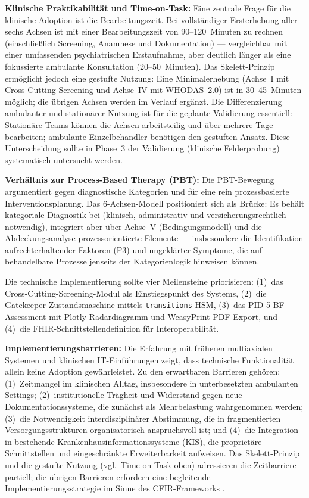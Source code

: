 \documentclass[11pt,a4paper]{article}
\begin{document}
\textbf{Klinische Praktikabilit\"at und Time-on-Task:} Eine zentrale Frage f\"ur die klinische Adoption ist die Bearbeitungszeit. Bei vollst\"andiger Ersterhebung aller sechs Achsen ist mit einer Bearbeitungszeit von 90--120~Minuten zu rechnen (einschlie\ss{}lich Screening, Anamnese und Dokumentation) --- vergleichbar mit einer umfassenden psychiatrischen Erstaufnahme, aber deutlich l\"anger als eine fokussierte ambulante Konsultation (20--50~Minuten). Das Skelett-Prinzip erm\"oglicht jedoch eine gestufte Nutzung: Eine Minimalerhebung (Achse~I mit Cross-Cutting-Screening und Achse~IV mit WHODAS~2.0) ist in 30--45~Minuten m\"oglich; die \"ubrigen Achsen werden im Verlauf erg\"anzt. Die Differenzierung ambulanter und station\"arer Nutzung ist f\"ur die geplante Validierung essentiell: Station\"are Teams k\"onnen die Achsen arbeitsteilig und \"uber mehrere Tage bearbeiten; ambulante Einzelbehandler ben\"otigen den gestuften Ansatz. Diese Unterscheidung sollte in Phase~3 der Validierung (klinische Felderprobung) systematisch untersucht werden.

\textbf{Verh\"altnis zur Process-Based Therapy (PBT):} Die PBT-Bewegung argumentiert gegen diagnostische Kategorien und f\"ur eine rein prozessbasierte Interventionsplanung. Das 6-Achsen-Modell positioniert sich als Br\"ucke: Es beh\"alt kategoriale Diagnostik bei (klinisch, administrativ und versicherungsrechtlich notwendig), integriert aber \"uber Achse~V (Bedingungsmodell) und die Abdeckungsanalyse prozessorientierte Elemente --- insbesondere die Identifikation aufrechterhaltender Faktoren (P3) und ungekl\"arter Symptome, die auf behandelbare Prozesse jenseits der Kategorienlogik hinweisen k\"onnen.

Die technische Implementierung sollte vier Meilensteine priorisieren: (1)~das Cross-Cutting-Screening-Modul als Einstiegspunkt des Systems, (2)~die Gatekeeper-Zustandsmaschine mittels \texttt{transitions} HSM, (3)~das PID-5-BF-Assessment mit Plotly-Radardiagramm und WeasyPrint-PDF-Export, und (4)~die FHIR-Schnittstellendefinition f\"ur Interoperabilit\"at.

\textbf{Implementierungsbarrieren:} Die Erfahrung mit fr\"uheren multiaxialen Systemen und klinischen IT-Einf\"uhrungen zeigt, dass technische Funktionalit\"at allein keine Adoption gew\"ahrleistet. Zu den erwartbaren Barrieren geh\"oren: (1)~Zeitmangel im klinischen Alltag, insbesondere in unterbesetzten ambulanten Settings; (2)~institutionelle Tr\"agheit und Widerstand gegen neue Dokumentationssysteme, die zun\"achst als Mehrbelastung wahrgenommen werden; (3)~die Notwendigkeit interdisziplin\"arer Abstimmung, die in fragmentierten Versorgungsstrukturen organisatorisch anspruchsvoll ist; und (4)~die Integration in bestehende Krankenhausinformationssysteme (KIS), die propriet\"are Schnittstellen und eingeschr\"ankte Erweiterbarkeit aufweisen. Das Skelett-Prinzip und die gestufte Nutzung (vgl.\ Time-on-Task oben) adressieren die Zeitbarriere partiell; die \"ubrigen Barrieren erfordern eine begleitende Implementierungsstrategie im Sinne des CFIR-Frameworks \citep{Damschroder2009}.
\end{document}
